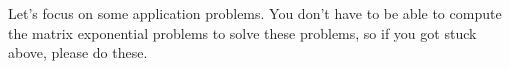 % 



Let's focus on some application problems.  You don't have to be able to compute the matrix exponential problems to solve these problems, so if you got stuck above, please do these. 

